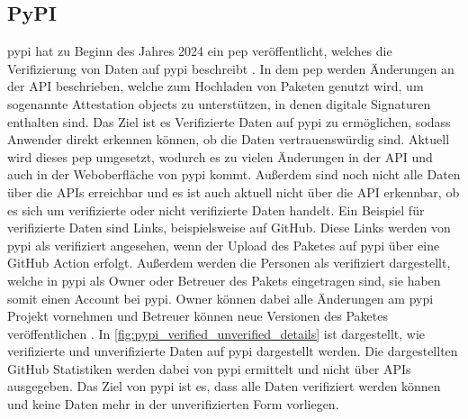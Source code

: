 \subsection{PyPI}
\label{subsec:pypi}
\gls{pypi} hat zu Beginn des Jahres 2024 ein \gls{pep} veröffentlicht, welches die Verifizierung von Daten auf \gls{pypi} beschreibt \autocite{python_software_foundation_pep_2024}.
In dem \gls{pep} werden Änderungen an der API beschrieben, welche zum Hochladen von Paketen genutzt wird, um sogenannte \glqq Attestation objects \grqq{} zu unterstützen, in denen digitale Signaturen enthalten sind.
Das Ziel ist es Verifizierte Daten auf \gls{pypi} zu ermöglichen, sodass Anwender direkt erkennen können, ob die Daten vertrauenswürdig sind.
Aktuell wird dieses \gls{pep} umgesetzt, wodurch es zu vielen Änderungen in der API und auch in der Weboberfläche von \gls{pypi} kommt.
Außerdem sind noch nicht alle Daten über die APIs erreichbar und es ist auch aktuell nicht über die API erkennbar, ob es sich um verifizierte oder nicht verifizierte Daten handelt.
Ein Beispiel für verifizierte Daten sind Links, beispielsweise auf GitHub.
Diese Links werden von \gls{pypi} als verifiziert angesehen, wenn der Upload des Paketes auf \gls{pypi} über eine GitHub Action erfolgt.
Außerdem werden die Personen als verifiziert dargestellt, welche in \gls{pypi} als Owner oder Betreuer des Pakets eingetragen sind, sie haben somit einen Account bei \gls{pypi}.
Owner können dabei alle Änderungen am \gls{pypi} Projekt vornehmen und Betreuer können neue Versionen des Paketes veröffentlichen \autocite{ingram_deprecate_2023}.
In \autoref{fig:pypi_verified_unverified_details} ist dargestellt, wie verifizierte und unverifizierte Daten auf \gls{pypi} dargestellt werden.
Die dargestellten GitHub Statistiken werden dabei von \gls{pypi} ermittelt und nicht über APIs ausgegeben.
Das Ziel von \gls{pypi} ist es, dass alle Daten verifiziert werden können und keine Daten mehr in der unverifizierten Form vorliegen.

